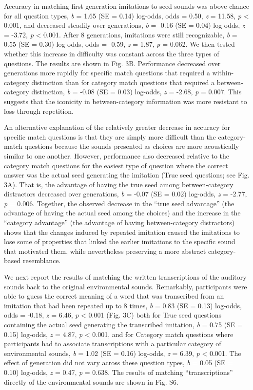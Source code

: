 \documentclass[english,floatsintext,man]{apa6}
\theoremstyle{definition}
\theoremstyle{definition}
\theoremstyle{definition}
\theoremstyle{remark}
\begin{document}
Accuracy in matching first generation imitations to seed sounds was
above chance for all question types, \emph{b} = 1.65 (SE = 0.14)
log-odds, odds = 0.50, \emph{z} = 11.58, \emph{p} \textless{} 0.001, and
decreased steadily over generations, \emph{b} = -0.16 (SE = 0.04)
log-odds, \emph{z} = -3.72, \emph{p} \textless{} 0.001. After 8
generations, imitations were still recognizable, \emph{b} = 0.55 (SE =
0.30) log-odds, odds = -0.59, \emph{z} = 1.87, \emph{p} = 0.062. We then
tested whether this increase in difficulty was constant across the three
types of questions. The results are shown in Fig. 3B. Performance
decreased over generations more rapidly for specific match questions
that required a within-category distinction than for category match
questions that required a between-category distinction, \emph{b} = -0.08
(SE = 0.03) log-odds, \emph{z} = -2.68, \emph{p} = 0.007. This suggests
that the iconicity in between-category information was more resistant to
loss through repetition.

An alternative explanation of the relatively greater decrease in
accuracy for specific match questions is that they are simply more
difficult than the category-match questions because the sounds presented
as choices are more acoustically similar to one another. However,
performance also decreased relative to the category match questions for
the easiest type of question where the correct answer was the actual
seed generating the imitation (True seed questions; see Fig. 3A). That
is, the advantage of having the true seed among between-category
distractors decreased over generations, \emph{b} = -0.07 (SE = 0.02)
log-odds, \emph{z} = -2.77, \emph{p} = 0.006. Together, the observed
decrease in the \enquote{true seed advantage} (the advantage of having
the actual seed among the choices) and the increase in the
\enquote{category advantage} (the advantage of having between-category
distractors) shows that the changes induced by repeated imitation caused
the imitations to lose some of properties that linked the earlier
imitations to the specific sound that motivated them, while nevertheless
preserving a more abstract category-based resemblance.

We next report the results of matching the written transcriptions of the
auditory sounds back to the original environmental sounds. Remarkably,
participants were able to guess the correct meaning of a word that was
transcribed from an imitation that had been repeated up to 8 times,
\emph{b} = 0.83 (SE = 0.13) log-odds, odds = -0.18, \emph{z} = 6.46,
\emph{p} \textless{} 0.001 (Fig. 3C) both for True seed questions
containing the actual seed generating the transcribed imitation,
\emph{b} = 0.75 (SE = 0.15) log-odds, \emph{z} = 4.87, \emph{p}
\textless{} 0.001, and for Category match questions where participants
had to associate transcriptions with a particular category of
environmental sounds, \emph{b} = 1.02 (SE = 0.16) log-odds, \emph{z} =
6.39, \emph{p} \textless{} 0.001. The effect of generation did not vary
across these question types, \emph{b} = 0.05 (SE = 0.10) log-odds,
\emph{z} = 0.47, \emph{p} = 0.638. The results of matching
\enquote{transcriptions} directly of the environmental sounds are shown
in Fig. S6.
\end{document}
